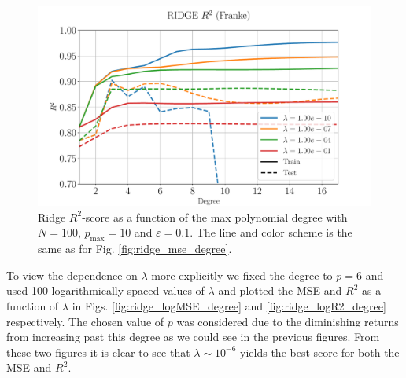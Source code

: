\documentclass[%
reprint,
amsmath,amssymb,
aps,
pra,
]{revtex4-2}
\begin{document}
\begin{figure}[ht!]
	\centering
	\includegraphics[width=\linewidth]{Python/Figures/Ridge/RIDGE_R2_no_scaling.pdf}
	\caption{Ridge $R^2$-score as a function of the max polynomial degree with \(N=100\), \(p_{\text{max}}=10\) and \(\varepsilon=0.1\). The line and color scheme is the same as for Fig. \ref{fig:ridge_mse_degree}.}
	\label{fig:ridge_r2_degree}
\end{figure}

To view the dependence on $\lambda$ more explicitly we fixed the degree to \(p=6\) and used 100 logarithmically spaced values of $\lambda$ and plotted the MSE and $R^2$ as a function of $\lambda$ in Figs. \ref{fig:ridge_logMSE_degree} and \ref{fig:ridge_logR2_degree} respectively. The chosen value of $p$ was considered due to the diminishing returns from increasing past this degree as we could see in the previous figures. From these two figures it is clear to see that $\lambda\sim 10^{-6}$ yields the best score for both the MSE and $R^2$.
\end{document}

